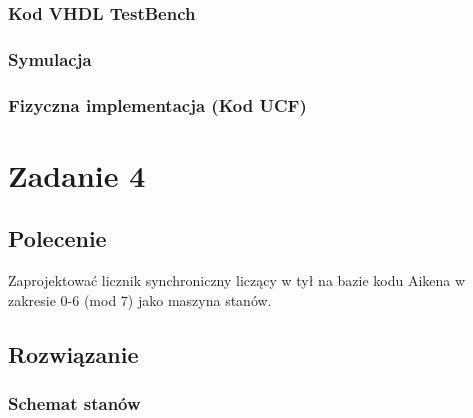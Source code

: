 \documentclass[a4paper,12pt]{extarticle}  %
\begin{document}
\subsubsection{Kod VHDL TestBench}

\subsubsection{Symulacja}
\begin{figure}[H]
   \centering
\end{figure}
\subsubsection{Fizyczna implementacja (Kod UCF)}

\section{Zadanie 4}
\subsection{Polecenie}
Zaprojektować licznik synchroniczny liczący w tył na bazie kodu Aikena w zakresie 0-6 (mod 7) jako maszyna stanów.
\subsection{Rozwiązanie}
\subsubsection{Schemat stanów}
\begin{figure}[H]
	\centering
\end{figure}
\end{document}
